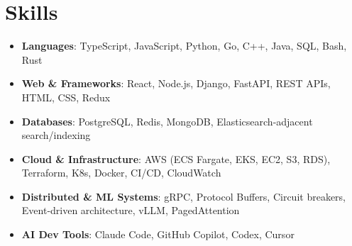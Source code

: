 \documentclass[letterpaper,11pt]{article}
\newcommand{\resumeSubHeadingListStart}{\begin{itemize}[leftmargin=0.15in, label={}]}
\newcommand{\resumeSubHeadingListEnd}{\end{itemize}}
\newcommand{\resumeSkillHeading}[2]{%
  \item\small{\textbf{#1}: #2 \vspace{-9pt}}%
}
\begin{document}
\section{Skills}
  \resumeSubHeadingListStart
    \resumeSkillHeading{Languages}{TypeScript, JavaScript, Python, Go, C++, Java, SQL, Bash, Rust}
    \resumeSkillHeading{Web \& Frameworks}{React, Node.js, Django, FastAPI, REST APIs, HTML, CSS, Redux}
    \resumeSkillHeading{Databases}{PostgreSQL, Redis, MongoDB, Elasticsearch-adjacent search/indexing}
    \resumeSkillHeading{Cloud \& Infrastructure}{AWS (ECS Fargate, EKS, EC2, S3, RDS), Terraform, K8s, Docker, CI/CD, CloudWatch}
    \resumeSkillHeading{Distributed \& ML Systems}{gRPC, Protocol Buffers, Circuit breakers, Event-driven architecture, vLLM, PagedAttention}
    \resumeSkillHeading{AI Dev Tools}{Claude Code, GitHub Copilot, Codex, Cursor}
  \resumeSubHeadingListEnd
\end{document}
